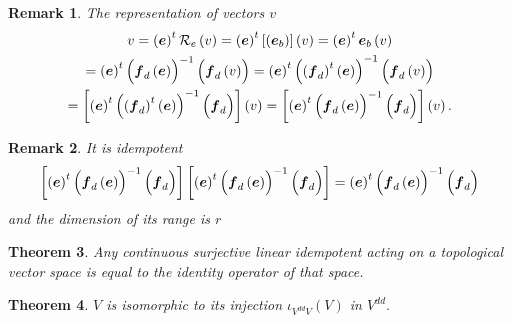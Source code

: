 \documentclass[aps,preprint]{revtex4}
\newtheorem{theorem}{Theorem}
\newtheorem{remark}[theorem]{Remark}
\begin{document}
\begin{remark}
The representation of vectors $v$ 
\begin{gather}
v=\left( \boldsymbol{e}\right) ^{t}\mathcal{R}_{e}\left( v\right) =\left( 
\boldsymbol{e}\right) ^{t}\left[ \left( \boldsymbol{e}_{b}\right) \right]
\left( v\right) =\left( \boldsymbol{e}\right) ^{t}\boldsymbol{e}_{b}\left(
v\right) \\
=\left( \overset{}{\boldsymbol{e}}\right) ^{t}\left( \overset{}{\boldsymbol{f%
}_{d}\left( \boldsymbol{e}\right) }\right) ^{-1}\left( \overset{}{%
\boldsymbol{f}_{d}\left( v\right) }\right) =\left( \overset{}{\boldsymbol{e}}%
\right) ^{t}\left( \overset{}{\left( \boldsymbol{f}_{d}\right) ^{t}\left( 
\boldsymbol{e}\right) }\right) ^{-1}\left( \overset{}{\boldsymbol{f}%
_{d}\left( v\right) }\right) \\
=\left[ \left( \overset{}{\boldsymbol{e}}\right) ^{t}\left( \overset{}{%
\left( \boldsymbol{f}_{d}\right) ^{t}\left( \boldsymbol{e}\right) }\right)
^{-1}\left( \overset{}{\boldsymbol{f}_{d}}\right) \right] \left( v\right) =%
\left[ \left( \overset{}{\boldsymbol{e}}\right) ^{t}\left( \overset{}{%
\boldsymbol{f}_{d}\left( \boldsymbol{e}\right) }\right) ^{-1}\left( \overset{%
}{\boldsymbol{f}_{d}}\right) \right] \left( v\right) .
\end{gather}
\end{remark}

\begin{remark}
It is idempotent 
\begin{equation}
\left[ \left( \overset{}{\boldsymbol{e}}\right) ^{t}\left( \overset{}{%
\boldsymbol{f}_{d}\left( \boldsymbol{e}\right) }\right) ^{-1}\left( \overset{%
}{\boldsymbol{f}_{d}}\right) \right] \left[ \left( \overset{}{\boldsymbol{e}}%
\right) ^{t}\left( \overset{}{\boldsymbol{f}_{d}\left( \boldsymbol{e}\right) 
}\right) ^{-1}\left( \overset{}{\boldsymbol{f}_{d}}\right) \right] =\left( 
\overset{}{\boldsymbol{e}}\right) ^{t}\left( \overset{}{\boldsymbol{f}%
_{d}\left( \boldsymbol{e}\right) }\right) ^{-1}\left( \overset{}{\boldsymbol{%
f}_{d}}\right)
\end{equation}%
and the dimension of its range is $r$
\end{remark}

\begin{theorem}
Any continuous surjective linear idempotent acting on a topological vector
space is equal to the identity operator of that space.
\end{theorem}

\begin{theorem}
$V$ is isomorphic to its injection $\iota _{V^{dd}V}\left( V\right) $ in $%
V^{dd}.$
\end{theorem}
\end{document}
